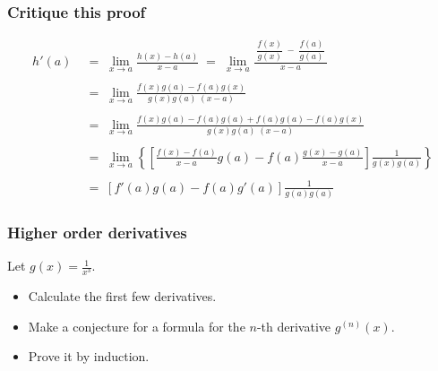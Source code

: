 \documentclass[14pt]{beamer}
\begin{document}
	\begin{frame}[t]
		\fontsize{13}{13}\selectfont
		\frametitle{Critique this proof}
		\vspace{-1cm}
		\begin{align*}
			h'(a) \; & = \; \lim_{x \to a}\frac{h(x) - h(a) }{x - a}\; = \; \lim_{x \to a}\frac{\; \dfrac{f(x)}{g(x)} \; - \; \dfrac{f(a)}{g(a)} \;}{x-a} \\
			\         \\
			         & = \; \lim_{x \to a}\frac{f(x)g(a) - f(a)g(x)}{g(x)g(a) \; (x-a)}                                                                   \\
			\         \\
			         & = \; \lim_{x \to a}\frac{f(x)g(a) - f(a)g(a) + f(a)g(a) - f(a) g(x)}{g(x) g(a) \; (x-a)}                                           \\
			\         \\
			         & = \; \lim_{x \to a}\left\{ \left[ \frac{f(x) - f(a)}{x-a}g(a) - f(a) \frac{g(x) - g(a)}{x-a}\right] \frac{1}{g(x) g(a)}\right\}    \\
			\         \\
			         & = \; \left[ f'(a) g(a) - f(a) g'(a) \right] \frac{1}{g(a) g(a)}
		\end{align*}
	\end{frame}





	\begin{frame}[t]
		\frametitle{Higher order derivatives}

		Let $\displaystyle g(x) = \frac{1}{x^{3}}$.

		\begin{itemize}
			\item Calculate the first few derivatives.

			\item Make a conjecture for a formula for the $n$-th derivative $\displaystyle
				g^{(n)}(x)$.

			\item Prove it by induction.
		\end{itemize}
	\end{frame}
\end{document}

